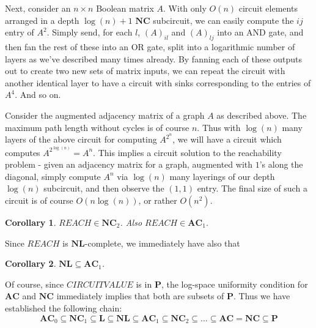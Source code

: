 \documentclass{article}
\theoremstyle{definition}
\theoremstyle{plain}
\theoremstyle{theorem}
\newtheorem{corollary}{Corollary}[section]
\begin{document}
Next, consider an $n \times n$ Boolean matrix $A$. With only $O(n)$ circuit elements arranged in a depth $\log(n)+1$ $\bm{NC}$ subcircuit, we can easily compute the $ij$ entry of $A^2$. Simply send, for each $l$, $(A)_{il}$ and $(A)_{lj}$ into an AND gate, and then fan the rest of these into an OR gate, split into a logarithmic number of layers as we've described many times already. By fanning each of these outputs out to create two new sets of matrix inputs, we can repeat the circuit with another identical layer to have a circuit with sinks corresponding to the entries of $A^4$. And so on. \par 
Consider the augmented adjacency matrix of a graph $A$ as described above. The maximum path length without cycles is of course $n$. Thus with $\log(n)$ many layers of the above circuit for computing $A^{2^n}$, we will have a circuit which computes $A^{2^{\log(n)}} = A^n$. This implies a circuit solution to the reachability problem - given an adjacency matrix for a graph, augmented with $1$'s along the diagonal, simply compute $A^n$ via $\log(n)$ many layerings of our depth $\log(n)$ subcircuit, and then observe the $(1,1)$ entry. The final size of such a circuit is of course $O(n\log(n))$, or rather $O(n^2)$.  
\begin{corollary}
	$REACH \in \bm{NC}_2$. Also $REACH \in \bm{AC}_1$. 
\end{corollary} 
Since $REACH$ is $\bm{NL}$-complete, we immediately have also that
\begin{corollary}
	$\bm{NL} \subseteq \bm{AC}_1$.
\end{corollary}
Of course, since $CIRCUITVALUE$ is in $\bm{P}$, the log-space uniformity condition for $\bm{AC}$ and $\bm{NC}$ immediately implies that both are subsets of $\bm{P}$. Thus we have established the following chain:
\[ \bm{AC}_0 \subseteq \bm{NC}_1 \subseteq \bm{L} \subseteq \bm{NL} \subseteq \bm{AC}_1 \subseteq \bm{NC}_2 \subseteq \ldots \subseteq \bm{AC} = \bm{NC} \subseteq \bm{P} \]
\end{document}
